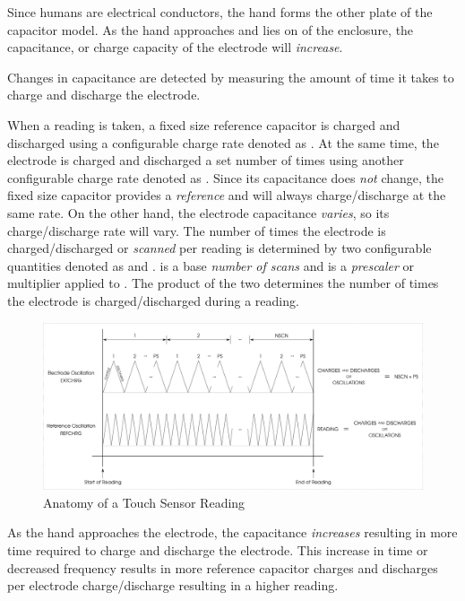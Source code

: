 Since humans are electrical conductors, the hand forms the other plate of the
capacitor model.  As the hand approaches and lies on  of the enclosure,
the capacitance, or charge capacity of the electrode will \textit{increase}.

\par\medskip

Changes in capacitance are detected by measuring the amount of time it takes to
charge and discharge the electrode.

\par\medskip

When a reading is taken, a fixed size reference capacitor is charged and
discharged using a configurable charge rate denoted as .  At the same
time, the electrode is charged and discharged a set number of times using
another configurable charge rate denoted as .  Since its capacitance
does \textit{not} change, the fixed size capacitor provides a \textit{reference} and will
always charge\slash discharge at the same rate.  On the other hand, the
electrode capacitance \textit{varies}, so its charge\slash discharge rate will
vary.  The number of times the electrode is charged\slash discharged or
\textit{scanned} per reading is determined by two configurable quantities
denoted as  and .   is a base
\textit{number of scans} and  is a \textit{prescaler} or multiplier
applied to .  The product of the two determines the number of times the
electrode is charged\slash discharged during a reading.

\begin{figure}[H]
\centering
  \includegraphics{images/touch_oscillation_graph.png}
\caption{Anatomy of a Touch Sensor Reading}
\end{figure}

As the hand approaches the electrode, the capacitance \textit{increases} resulting in
more time required to charge and discharge the electrode.  This increase in time
or decreased frequency results in more reference capacitor charges and
discharges per electrode charge\slash discharge resulting in a higher reading.

